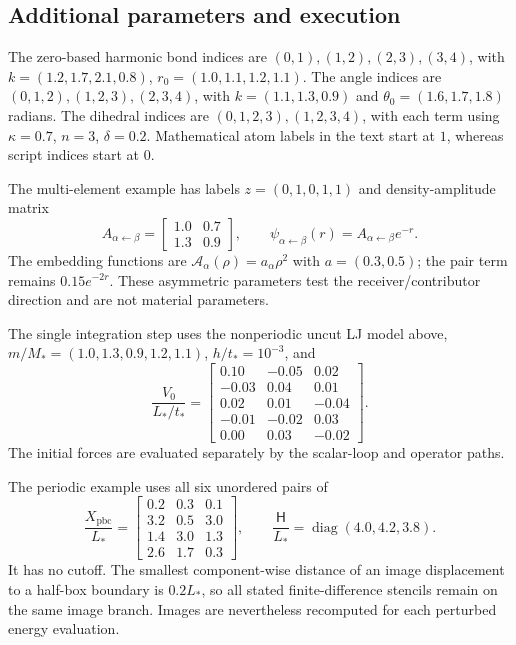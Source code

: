 \documentclass[11pt,a4paper]{article}
\newcommand{\diag}{\operatorname{diag}}
\newcommand{\cell}{\mathsf H}
\theoremstyle{definition}
\begin{document}
\subsection{Additional parameters and execution}
The zero-based harmonic bond indices are $(0,1),(1,2),(2,3),(3,4)$, with
$k=(1.2,1.7,2.1,0.8)$, $r_0=(1.0,1.1,1.2,1.1)$.
The angle indices are $(0,1,2),(1,2,3),(2,3,4)$, with
$k=(1.1,1.3,0.9)$ and $\theta_0=(1.6,1.7,1.8)$ radians.
The dihedral indices are $(0,1,2,3),(1,2,3,4)$, with each term using
$\kappa=0.7$, $n=3$, $\delta=0.2$.
Mathematical atom labels in the text start at $1$, whereas script indices start at $0$.

The multi-element example has labels $z=(0,1,0,1,1)$ and density-amplitude matrix
\begin{equation}
 A_{\alpha\leftarrow\beta}=\begin{bmatrix}1.0&0.7\\1.3&0.9\end{bmatrix},\qquad
 \psi_{\alpha\leftarrow\beta}(r)=A_{\alpha\leftarrow\beta}e^{-r}.
\end{equation}
The embedding functions are $\mathcal A_\alpha(\rho)=a_\alpha\rho^2$ with $a=(0.3,0.5)$; the
pair term remains $0.15e^{-2r}$. These asymmetric parameters test the receiver/contributor
direction and are not material parameters.

The single integration step uses the nonperiodic uncut LJ model above,
$m/M_*=(1.0,1.3,0.9,1.2,1.1)$, $h/t_*=10^{-3}$, and
\begin{equation}
\frac{V_0}{L_*/t_*}=\begin{bmatrix}
0.10&-0.05&0.02\\
-0.03&0.04&0.01\\
0.02&0.01&-0.04\\
-0.01&-0.02&0.03\\
0.00&0.03&-0.02
\end{bmatrix}.
\end{equation}
The initial forces are evaluated separately by the scalar-loop and operator paths.

The periodic example uses all six unordered pairs of
\begin{equation}
\frac{X_{\mathrm{pbc}}}{L_*}=\begin{bmatrix}
0.2&0.3&0.1\\
3.2&0.5&3.0\\
1.4&3.0&1.3\\
2.6&1.7&0.3
\end{bmatrix},\qquad
\frac{\cell}{L_*}=\diag(4.0,4.2,3.8).
\end{equation}
It has no cutoff. The smallest component-wise distance of an image displacement to a
half-box boundary is $0.2L_*$, so all stated finite-difference stencils remain on the same
image branch. Images are nevertheless recomputed for each perturbed energy evaluation.
\end{document}
